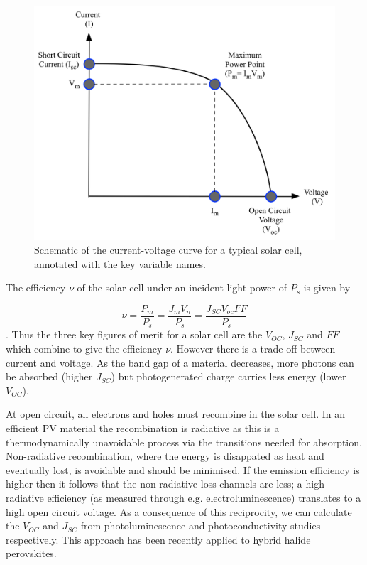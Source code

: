  \begin{figure}[h]
 \centering
   \includegraphics[width=1.0\columnwidth]{figures/ch1/current-voltage.png}
   \caption[Solar cell current-voltage curve]{Schematic of the current-voltage curve for a typical solar cell, annotated with the key variable names.}
   \label{current_voltage}
 \end{figure}

The efficiency $\nu$ of the solar cell under an incident light power of $P_s$ is given by

$$\nu = \frac{P_m}{P_s} = \frac{J_m V_n}{P_s} = \frac{J_{SC} V_{oc} FF}{P_s}$$.
Thus the three key figures of merit for a solar cell are the $V_{OC}$, $J_{SC}$ and $FF$ which combine to give the efficiency $\nu$. 
However there is a trade off between current and voltage. As the band gap of a material decreases, more photons can be absorbed (higher $J_{SC}$) but photogenerated charge carries less energy (lower $V_{OC}$).

At open circuit, all electrons and holes must recombine in the solar cell. In an efficient PV material the recombination is radiative as this is a thermodynamically unavoidable process via the transitions needed for absorption. Non-radiative recombination, where the energy is disappated as heat and eventually lost, is avoidable and should be minimised. If the emission efficiency is higher then it follows that the non-radiative loss channels are less; a high radiative efficiency (as measured through e.g. electroluminescence) translates to a high open circuit voltage.\autocite{Rau2007}
As a consequence of this reciprocity, we can calculate the $V_{OC}$ and $J_{SC}$ from photoluminescence and photoconductivity studies respectively. This approach has been recently applied to hybrid halide perovskites.\autocite{Braly2018}

